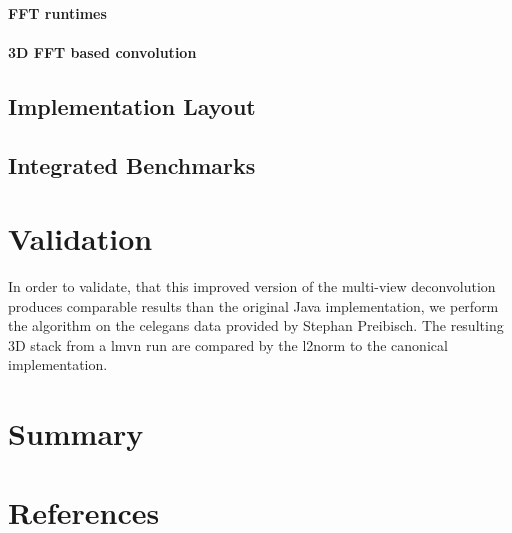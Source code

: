 \documentclass [12pt]{article}
\begin{document}
\paragraph{FFT runtimes}

\paragraph{3D FFT based convolution}

\subsection{Implementation Layout}

\subsection{Integrated Benchmarks}

\section{Validation}

In order to validate, that this improved version of the multi-view deconvolution produces comparable results than the original Java implementation, we perform the algorithm on the celegans data provided by Stephan Preibisch. The resulting 3D stack from a lmvn run are compared by the l2norm to the canonical implementation.

\section{Summary}


\section{References}
\end{document}

